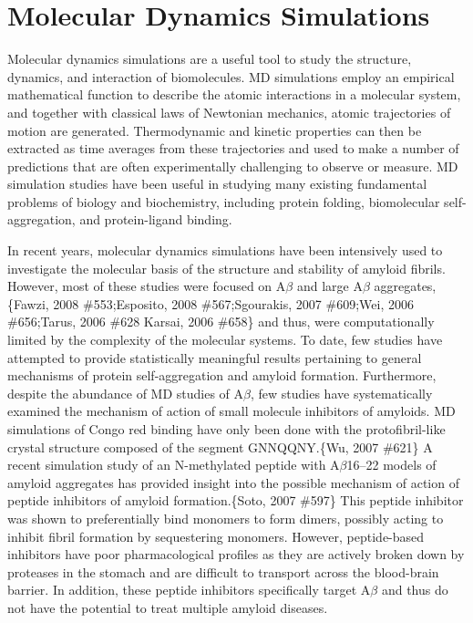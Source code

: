 \section{Molecular Dynamics Simulations}

Molecular dynamics simulations are a useful tool to study the structure, dynamics, and interaction of biomolecules. MD simulations employ an empirical mathematical function to describe the atomic interactions in a molecular system, and together with classical laws of Newtonian mechanics, atomic trajectories of motion are generated. Thermodynamic and kinetic properties can then be extracted as time averages from these trajectories and used to make a number of predictions that are often experimentally challenging to observe or measure. MD simulation studies have been useful in studying many existing fundamental problems of biology and biochemistry, including protein folding, biomolecular self-aggregation, and protein-ligand binding.

In recent years, molecular dynamics simulations have been intensively used to investigate the molecular basis of the structure and stability of amyloid fibrils. However, most of these studies were focused on A$\beta$ and large A$\beta$ aggregates,\{Fawzi, 2008 \#553;Esposito, 2008 \#567;Sgourakis, 2007 \#609;Wei, 2006 \#656;Tarus, 2006 \#628 Karsai, 2006 \#658\} and thus, were computationally limited by the complexity of the molecular systems. To date, few studies have attempted to provide statistically meaningful results pertaining to general mechanisms of protein self-aggregation and amyloid formation. Furthermore, despite the abundance of MD studies of A$\beta$, few studies have systematically examined the mechanism of action of small molecule inhibitors of amyloids. MD simulations of Congo red binding have only been done with the protofibril-like crystal structure composed of the segment GNNQQNY.\{Wu, 2007 \#621\} A recent simulation study of an N-methylated peptide with A$\beta$16--22 models of amyloid aggregates has provided insight into the possible mechanism of action of peptide inhibitors of amyloid formation.\{Soto, 2007 \#597\} This peptide inhibitor was shown to preferentially bind monomers to form dimers, possibly acting to inhibit fibril formation by sequestering monomers. However, peptide-based inhibitors have poor pharmacological profiles as they are actively broken down by proteases in the stomach and are difficult to transport across the blood-brain barrier. In addition, these peptide inhibitors specifically target A$\beta$ and thus do not have the potential to treat multiple amyloid diseases. 

